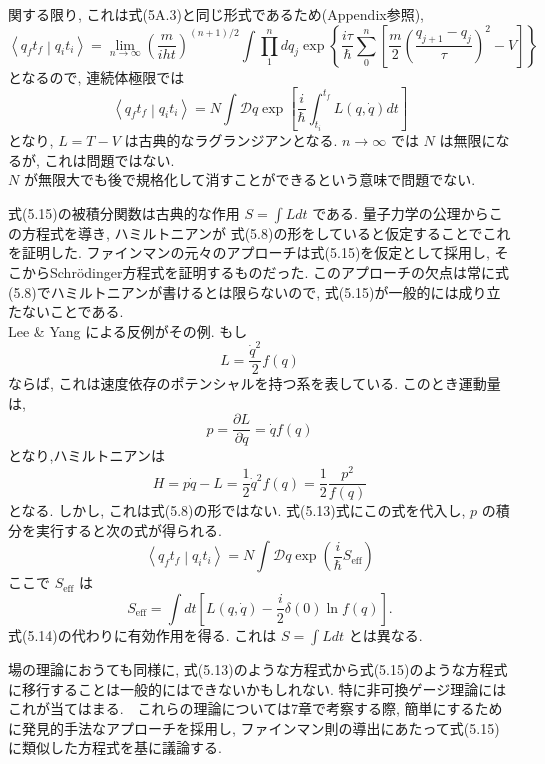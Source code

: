 \documentclass[a4paper,12pt]{article}
\newcommand{\braket}[2]{\left\langle #1\middle|#2\right\rangle}
\begin{document}
関する限り, これは式(5A.3)と同じ形式であるため(Appendix参照),
\begin{equation*}
    \braket{q_{f}t_{f}}{q_{i}t_{i}} = \lim_{n \rightarrow \infty} \left( \frac{m}{iht} \right)^{(n+1)/2} \int \prod_{1}^{n}dq_{j}\exp\left\{ \frac{i\tau}{\hbar}\sum_{0}^{n}\left[ \frac{m}{2} \left(\frac{q_{j+1} - q_{j}}{\tau}\right)^2 -V \right] \right\}\tag{5.14}
\end{equation*}
となるので, 連続体極限では
\begin{equation*}
    \braket{q_{f}t_{f}}{q_{i}t_{i}} = N\int \mathcal{D}q \exp\left[ \frac{i}{\hbar}\int_{t_i}^{t_f} L(q, \dot{q})dt \right] \tag{5.15}
\end{equation*}
となり, $L = T - V$ は古典的なラグランジアンとなる. $n \rightarrow \infty$ では $N$ は無限になるが, これは問題ではない.\\
\color{blue}
$N$ が無限大でも後で規格化して消すことができるという意味で問題でない.
\color{black}\par
式(5.15)の被積分関数は古典的な作用 $\displaystyle S = \int L dt$ である. 量子力学の公理からこの方程式を導き, ハミルトニアンが 式(5.8)の形をしていると仮定することでこれを証明した. ファインマンの元々のアプローチは式(5.15)を仮定として採用し, そこからSchr\"{o}dinger方程式を証明するものだった. このアプローチの欠点は常に式(5.8)でハミルトニアンが書けるとは限らないので, 式(5.15)が一般的には成り立たないことである.\\
 Lee \& Yang による反例がその例. もし
\begin{equation*}
    L = \frac{\dot{q}^2}{2}f(q)
\end{equation*} 
ならば, これは速度依存のポテンシャルを持つ系を表している. このとき運動量は,
\begin{equation*}
    p = \frac{\partial L}{\partial \dot{q}} = \dot{q}f(q)
\end{equation*}
となり,ハミルトニアンは
\begin{equation*}
    H = p\dot{q} - L = \frac{1}{2}\dot{q}^2 f(q) = \frac{1}{2}\frac{p^2}{f(q)}
\end{equation*}
となる. しかし, これは式(5.8)の形ではない. 式(5.13)式にこの式を代入し, $p$ の積分を実行すると次の式が得られる.
\begin{equation*}
    \braket{q_{f}t_{f}}{q_{i}t_{i}} = N\int \mathcal{D}q \exp\left( \frac{i}{\hbar}S_{\textrm{eff}} \right)
\end{equation*}
ここで $S_{\textrm{eff}}$ は
\begin{equation*}
    S_{\textrm{eff}} = \int dt \left[ L(q, \dot{q}) - \frac{i}{2}\delta(0)\ln f(q) \right].
\end{equation*}
式(5.14)の代わりに有効作用を得る. これは $\displaystyle S = \int L dt$ とは異なる.\par
場の理論におうても同様に, 式(5.13)のような方程式から式(5.15)のような方程式に移行することは一般的にはできないかもしれない. 特に非可換ゲージ理論にはこれが当てはまる.　これらの理論については7章で考察する際, 簡単にするために発見的手法なアプローチを採用し, ファインマン則の導出にあたって式(5.15)に類似した方程式を基に議論する.
\end{document}
